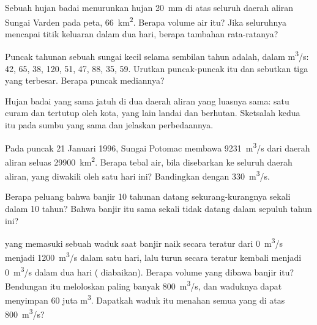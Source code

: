 \begin{exercise}[$\star\star$]\label{exo:g10:drainage-basins:7}
Sebuah hujan badai menurunkan hujan \qty{20}{mm} di atas seluruh daerah aliran
Sungai Varden pada peta, \qty{66}{km^2}. Berapa volume air itu? Jika seluruhnya
mencapai titik keluaran dalam dua hari, berapa  tambahan rata-ratanya?
\end{exercise}

\begin{exercise}[$\star\star$]\label{exo:g10:drainage-basins:8}
Puncak tahunan sebuah sungai kecil selama sembilan tahun adalah, dalam
\unit{m^3/s}: \num{42}, \num{65}, \num{38}, \num{120}, \num{51}, \num{47},
\num{88}, \num{35}, \num{59}. Urutkan puncak-puncak itu dan sebutkan  tiga yang terbesar. Berapa  puncak mediannya?
\end{exercise}

\begin{exercise}[$\star\star$]\label{exo:g10:drainage-basins:9}
Hujan badai yang sama jatuh di dua daerah aliran yang luasnya sama: satu
curam dan tertutup oleh kota, yang lain landai dan berhutan. Sketsalah kedua
 itu pada sumbu yang sama dan jelaskan perbedaannya.
\end{exercise}

\begin{exercise}[$\star\star$]\label{exo:g10:drainage-basins:10}
Pada puncak 21 Januari 1996, Sungai Potomac membawa \qty{9231}{m^3/s} dari
daerah aliran seluas \qty{29900}{km^2}. Berapa tebal air, bila disebarkan ke
seluruh daerah aliran, yang diwakili oleh satu hari  ini? Bandingkan
dengan  \qty{330}{m^3/s}.
\end{exercise}

\begin{exercise}[$\star\star$]\label{exo:g10:drainage-basins:11}
Berapa peluang bahwa banjir \num{10} tahunan datang sekurang-kurangnya sekali
dalam \num{10} tahun? Bahwa banjir itu sama sekali tidak datang dalam sepuluh
tahun ini?
\end{exercise}

\begin{exercise}[$\star\star\star$]\label{exo:g10:drainage-basins:12}
 yang memasuki sebuah waduk saat banjir naik secara teratur dari
\qty{0}{m^3/s} menjadi \qty{1200}{m^3/s} dalam satu hari, lalu turun secara
teratur kembali menjadi \qty{0}{m^3/s} dalam dua hari (
diabaikan). Berapa volume yang dibawa banjir itu? Bendungan itu meloloskan
paling banyak \qty{800}{m^3/s}, dan waduknya dapat menyimpan \num{60} juta
\unit{m^3}. Dapatkah waduk itu menahan semua yang di atas \qty{800}{m^3/s}?
\end{exercise}

